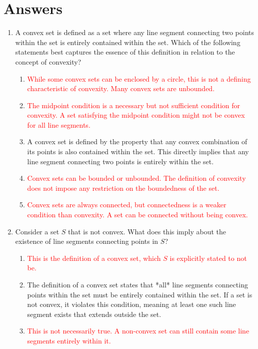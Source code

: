 \documentclass{article}%
\newcommand{\incorrect}[1]{\textcolor{red}{#1}}
\begin{document}
\section{Answers}%
\label{sec:Answers}%
\begin{enumerate}%
\item A convex set is defined as a set where any line segment connecting two points within the set is entirely contained within the set.  Which of the following statements best captures the essence of this definition in relation to the concept of convexity?%
\begin{enumerate}%
\item \incorrect{While some convex sets can be enclosed by a circle, this is not a defining characteristic of convexity.  Many convex sets are unbounded.}%
\item \incorrect{The midpoint condition is a necessary but not sufficient condition for convexity.  A set satisfying the midpoint condition might not be convex for all line segments.}%
\item A convex set is defined by the property that any convex combination of its points is also contained within the set. This directly implies that any line segment connecting two points is entirely within the set.%
\item \incorrect{Convex sets can be bounded or unbounded.  The definition of convexity does not impose any restriction on the boundedness of the set.}%
\item \incorrect{Convex sets are always connected, but connectedness is a weaker condition than convexity.  A set can be connected without being convex.}%
\end{enumerate}%
\vspace{1em}%
\item Consider a set $S$ that is not convex. What does this imply about the existence of line segments connecting points in $S$?%
\begin{enumerate}%
\item \incorrect{This is the definition of a convex set, which $S$ is explicitly stated to not be.}%
\item The definition of a convex set states that *all* line segments connecting points within the set must be entirely contained within the set.  If a set is not convex, it violates this condition, meaning at least one such line segment exists that extends outside the set.%
\item \incorrect{This is not necessarily true.  A non-convex set can still contain some line segments entirely within it.}%

\end{enumerate}
\end{enumerate}
\end{document}

